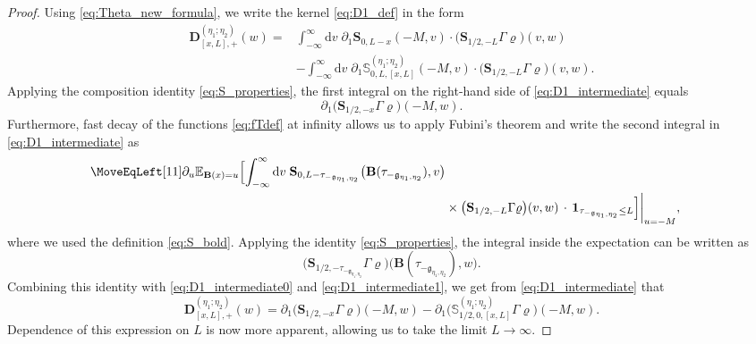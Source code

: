 \documentclass[oneside,final,11pt]{amsart}
\theoremstyle{definition}
\newcommand{\fg}{\mathfrak{g}}
\renewcommand{\d}{\mathrm{d}}
\renewcommand{\SS}{\mathbb{S}}
\newcommand{\1}[1]{\mathbf{1}_{#1}}
\newcommand{\E}{\mathbb E}
\newcommand{\fT}{\mathbf{S}}
\newcommand{\fx}{x}
\newcommand{\fM}{M}
\newcommand{\fD}{\mathbf{D}}
\newcommand{\fB}{\mathbf{B}}
\numberwithin{equation}{section}
\begin{document}
\begin{proof}
Using \eqref{eq:Theta_new_formula}, we write  the kernel \eqref{eq:D1_def} in the form
\begin{equation}
\begin{split}
	\fD^{(\eta_1; \eta_2)}_{[\fx, L], +}(w) =& \int_{-\infty}^\infty \d v\; \partial_{1} \fT_{0, L - \fx} (-M, v) \cdot \bigl(\fT_{1/2,-L} \Gamma \varrho\bigr) (v, w)\\
	&- \int_{-\infty}^\infty \d v\; \partial_{1} \SS_{0, L, [\fx, L]}^{(\eta_1; \eta_2)} (-M, v) \cdot \bigl(\fT_{1/2,-L} \Gamma \varrho\bigr) (v, w).
\end{split}
\label{eq:D1_intermediate}
\end{equation}
Applying the composition identity \eqref{eq:S_properties}, the first integral on the right-hand side of \eqref{eq:D1_intermediate} equals
\begin{equation}\label{eq:D1_intermediate0}
	\partial_{1} \bigl(\fT_{1/2,-\fx} \Gamma \varrho\bigr) (-\fM, w).
\end{equation}
Furthermore, fast decay of the functions \eqref{eq:fTdef} at infinity allows us to apply Fubini's theorem and write the second integral in \eqref{eq:D1_intermediate} as
\begin{equation}\label{eq:D1_intermediate1}
\begin{split}
\MoveEqLeft[11]
	\partial_{u} \E_{\fB(\fx)=u}\Bigl[ \int_{-\infty}^\infty \d v\; \fT_{0, L - \tau_{-\fg_{\eta_1, \eta_2}}} \bigl(\fB(\tau_{-\fg_{\eta_1, \eta_2}}), v \bigr)\\
	&\times \bigl(\fT_{1/2,-L} \Gamma \varrho\bigr) (v, w) \,\cdot\, \1{\tau_{-\fg_{\eta_1, \eta_2}} \leq L}\Bigr] \bigg|_{u = -M},
\end{split}
\end{equation}
where we used the definition \eqref{eq:S_bold}. Applying the identity \eqref{eq:S_properties}, the integral inside the expectation can be written as
\begin{equation}
	\bigl(\fT_{1/2, - \tau_{-\fg_{\eta_1, \eta_2}}} \Gamma \varrho\bigr) \bigl(\fB(\tau_{-\fg_{\eta_1, \eta_2}}), w\bigr).
\end{equation}
Combining this identity with \eqref{eq:D1_intermediate0} and \eqref{eq:D1_intermediate1}, we get from \eqref{eq:D1_intermediate} that
\begin{equation}\label{eq:D1_new_formula}
\fD^{(\eta_1; \eta_2)}_{[\fx, L], +}(w) = \partial_{1} \bigl(\fT_{1/2,-\fx} \Gamma \varrho\bigr) (-\fM, w) - \partial_{1} \bigl( \SS_{1/2, 0, [\fx, L]}^{(\eta_1; \eta_2)} \Gamma \varrho\bigr) (-\fM, w).
\end{equation}
Dependence of this expression on $L$ is now more apparent, allowing us to take the limit $L \to \infty$.


\end{proof}
\end{document}
